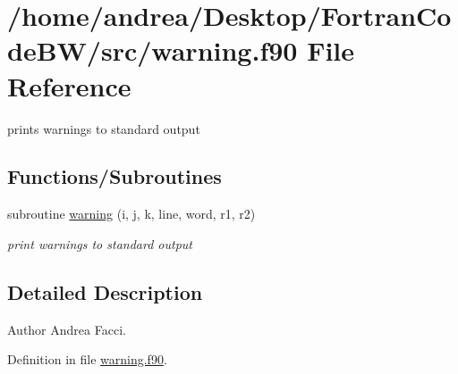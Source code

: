 \hypertarget{warning_8f90}{\section{/home/andrea/\-Desktop/\-Fortran\-Code\-B\-W/src/warning.f90 File Reference}
\label{warning_8f90}
}


prints warnings to standard output  


\subsection*{Functions/\-Subroutines}
\begin{DoxyCompactItemize}
\item 
subroutine \hyperlink{warning_8f90_ad7335e6f906b46bf4211928111c616fd}{warning} (i, j, k, line, word, r1, r2)
\begin{DoxyCompactList}\small\item\em print warnings to standard output \end{DoxyCompactList}\end{DoxyCompactItemize}


\subsection{Detailed Description}
\begin{DoxyAuthor}{Author}
Andrea Facci. 
\end{DoxyAuthor}


Definition in file \hyperlink{warning_8f90_source}{warning.\-f90}.



